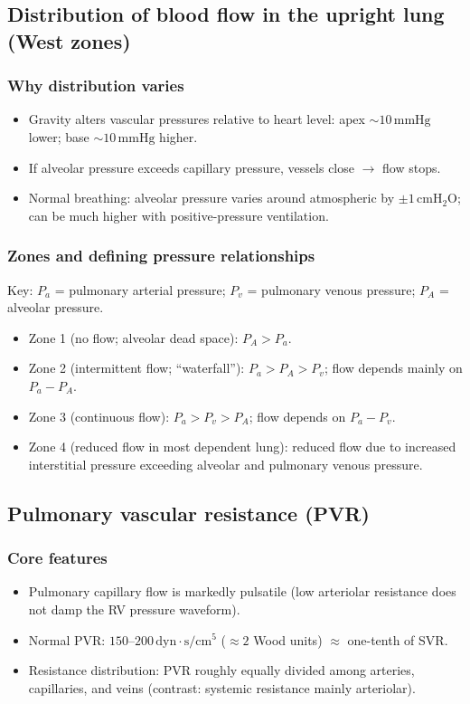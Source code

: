 \documentclass[11pt,a4paper]{article}
\begin{document}
\subsection{Distribution of blood flow in the upright lung (West zones)}
\subsubsection{Why distribution varies}
\begin{itemize}
  \item Gravity alters vascular pressures relative to heart level: apex \(\sim 10\,\mathrm{mmHg}\) lower; base \(\sim 10\,\mathrm{mmHg}\) higher.
  \item If alveolar pressure exceeds capillary pressure, vessels close \(\rightarrow\) flow stops.
  \item Normal breathing: alveolar pressure varies around atmospheric by \(\pm 1\,\mathrm{cmH_2O}\); can be much higher with positive-pressure ventilation.
\end{itemize}

\subsubsection{Zones and defining pressure relationships}
\noindent Key: \(P_a\) = pulmonary arterial pressure; \(P_v\) = pulmonary venous pressure; \(P_A\) = alveolar pressure.
\begin{itemize}
  \item Zone 1 (no flow; alveolar dead space): \(P_A > P_a\).
  \item Zone 2 (intermittent flow; ``waterfall''): \(P_a > P_A > P_v\); flow depends mainly on \(P_a - P_A\).
  \item Zone 3 (continuous flow): \(P_a > P_v > P_A\); flow depends on \(P_a - P_v\).
  \item Zone 4 (reduced flow in most dependent lung): reduced flow due to increased interstitial pressure exceeding alveolar and pulmonary venous pressure.
\end{itemize}

\subsection{Pulmonary vascular resistance (PVR)}
\subsubsection{Core features}
\begin{itemize}
  \item Pulmonary capillary flow is markedly pulsatile (low arteriolar resistance does not damp the RV pressure waveform).
  \item Normal PVR: \(150\text{--}200\,\mathrm{dyn\cdot s/cm^5}\) (\(\approx 2\) Wood units) \(\approx\) one-tenth of SVR.
  \item Resistance distribution: PVR roughly equally divided among arteries, capillaries, and veins (contrast: systemic resistance mainly arteriolar).
\end{itemize}
\end{document}
